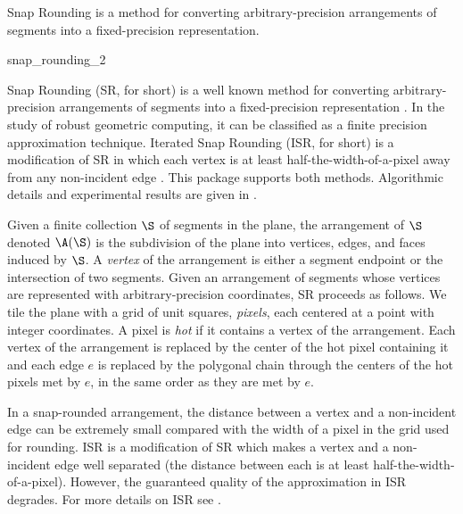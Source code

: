 

Snap Rounding is a method for converting arbitrary-precision
arrangements of segments into a fixed-precision representation.

\begin{ccRefFunction}{snap_rounding_2}

\ccDefinition

Snap Rounding (SR, for short) is a well known method for converting
arbitrary-precision arrangements of segments into a fixed-precision
representation \cite{gght-srlse-97, gm-rad-98, h-psifp-99}. In
the study of robust geometric computing, it can be classified as a
finite precision approximation technique. Iterated Snap Rounding (ISR,
for short) is a modification of SR in which each vertex is at least
half-the-width-of-a-pixel away from any non-incident edge
\cite{cgal:hp-isr-02}. This package supports both methods. Algorithmic
details and experimental results are given in \cite{cgal:hp-isr-02}.

Given a finite collection $\S$ of segments in the plane, the
arrangement of $\S$ denoted $\A(\S)$ is the subdivision of the plane
into vertices, edges, and faces induced by $\S$. %
A {\it vertex\/} of the arrangement is either a segment endpoint or
the intersection of two segments. Given an arrangement of segments
whose vertices are represented with arbitrary-precision coordinates,
SR proceeds as follows.  We tile the plane
with a grid of unit squares, {\it pixels}, each centered at a point
with integer coordinates. A pixel is {\it hot\/} if it contains a
vertex of the arrangement. Each vertex of the arrangement is replaced
by the center of the hot pixel containing it and each edge $e$ is
replaced by the polygonal chain through the centers of the hot pixels
met by $e$, in the same order as they are met by $e$.

In a snap-rounded arrangement, the distance between a vertex and
a non-incident edge can be extremely small compared with the width of a
pixel in the grid used for rounding. ISR is a modification of SR which
makes a vertex and a non-incident edge well separated (the distance
between each is at least half-the-width-of-a-pixel). However, the
guaranteed quality of the approximation in ISR degrades. For more
details on ISR see \cite{cgal:hp-isr-02}.


\end{ccRefFunction}
